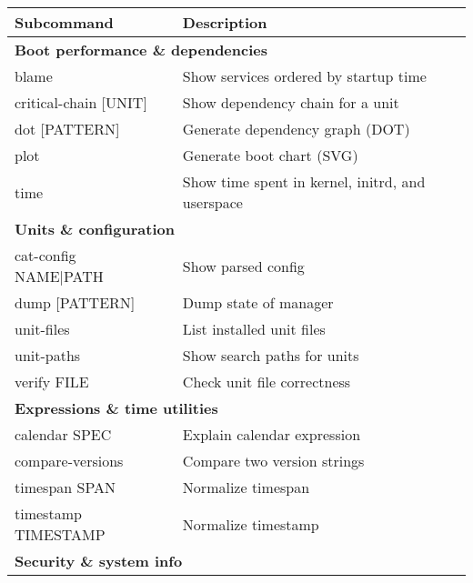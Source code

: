\documentclass[openany, 12pt]{book}
\begin{document}
\begin{table}

  \begin{center}
    \begin{tabular}{ll}
      \toprule
      \textbf{Subcommand}     & \textbf{Description}                             \\
      \midrule
      \multicolumn{2}{l}{\textbf{Boot performance \& dependencies}}              \\
      blame                   & Show services ordered by startup time            \\
      critical-chain [UNIT]   & Show dependency chain for a unit                 \\
      dot [PATTERN]           & Generate dependency graph (DOT)                  \\
      plot                    & Generate boot chart (SVG)                        \\
      time                    & Show time spent in kernel, initrd, and userspace \\
      \midrule
      \multicolumn{2}{l}{\textbf{Units \& configuration}}                        \\
      cat-config NAME|PATH    & Show parsed config                               \\
      dump [PATTERN]          & Dump state of manager                            \\
      unit-files              & List installed unit files                        \\
      unit-paths              & Show search paths for units                      \\
      verify FILE             & Check unit file correctness                      \\
      \midrule
      \multicolumn{2}{l}{\textbf{Expressions \& time utilities}}                 \\
      calendar SPEC           & Explain calendar expression                      \\
      compare-versions        & Compare two version strings                      \\
      timespan SPAN           & Normalize timespan                               \\
      timestamp TIMESTAMP     & Normalize timestamp                              \\
      \midrule
      \multicolumn{2}{l}{\textbf{Security \& system info}}                       \\

\end{tabular}
\end{center}
\end{table}
\end{document}
